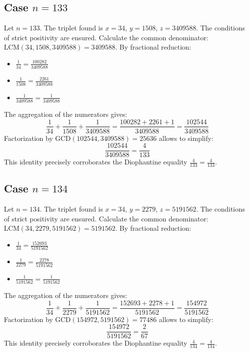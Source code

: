 \documentclass[11pt,a4paper]{article}
\begin{document}
\subsection{Case $n = 133$}
Let $n = 133$. The triplet found is $x = 34$, $y = 1508$, $z = 3409588$.
The conditions of strict positivity are ensured.
Calculate the common denominator: $\text{LCM}(34, 1508, 3409588) = 3409588$.
By fractional reduction:
\begin{itemize}
    \item $\frac{1}{34} = \frac{100282}{3409588}$
    \item $\frac{1}{1508} = \frac{2261}{3409588}$
    \item $\frac{1}{3409588} = \frac{1}{3409588}$
\end{itemize}
The aggregation of the numerators gives:
$$ \frac{1}{34} + \frac{1}{1508} + \frac{1}{3409588} = \frac{100282 + 2261 + 1}{3409588} = \frac{102544}{3409588} $$
Factorization by $\text{GCD}(102544, 3409588) = 25636$ allows to simplify:
$$ \frac{102544}{3409588} = \frac{4}{133} $$
This identity precisely corroborates the Diophantine equality $\frac{4}{133} = \frac{4}{133}$.

\subsection{Case $n = 134$}
Let $n = 134$. The triplet found is $x = 34$, $y = 2279$, $z = 5191562$.
The conditions of strict positivity are ensured.
Calculate the common denominator: $\text{LCM}(34, 2279, 5191562) = 5191562$.
By fractional reduction:
\begin{itemize}
    \item $\frac{1}{34} = \frac{152693}{5191562}$
    \item $\frac{1}{2279} = \frac{2278}{5191562}$
    \item $\frac{1}{5191562} = \frac{1}{5191562}$
\end{itemize}
The aggregation of the numerators gives:
$$ \frac{1}{34} + \frac{1}{2279} + \frac{1}{5191562} = \frac{152693 + 2278 + 1}{5191562} = \frac{154972}{5191562} $$
Factorization by $\text{GCD}(154972, 5191562) = 77486$ allows to simplify:
$$ \frac{154972}{5191562} = \frac{2}{67} $$
This identity precisely corroborates the Diophantine equality $\frac{4}{134} = \frac{4}{134}$.
\end{document}
